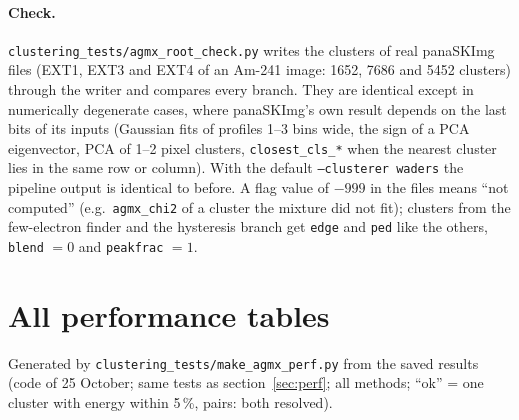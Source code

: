 \documentclass[11pt,a4paper]{article}
\newcommand{\code}[1]{\texttt{#1}}
\begin{document}
\paragraph{Check.} \code{clustering\_tests/agmx\_root\_check.py} writes the clusters of real panaSKImg files (EXT1, EXT3 and
EXT4 of an Am-241 image: 1652, 7686 and 5452 clusters) through the writer and compares every branch. They are identical except
in numerically degenerate cases, where panaSKImg's own result depends on the last bits of its inputs (Gaussian fits of profiles
1--3 bins wide, the sign of a PCA eigenvector, PCA of 1--2 pixel clusters, \code{closest\_cls\_*} when the nearest cluster lies
in the same row or column). With the default \code{--clusterer waders} the pipeline output is identical to before. A flag value
of $-999$ in the files means ``not computed'' (e.g.\ \code{agmx\_chi2} of a cluster the mixture did not fit); clusters from the
few-electron finder and the hysteresis branch get \code{edge} and \code{ped} like the others, \code{blend} $=0$ and
\code{peakfrac} $=1$.

\appendix
\section{All performance tables}\label{app:tables}
Generated by \code{clustering\_tests/make\_agmx\_perf.py} from the saved results (code of 25 October; same tests as
section~\ref{sec:perf}; all methods; ``ok'' = one cluster with energy within 5\,\%, pairs: both resolved).


\end{document}
